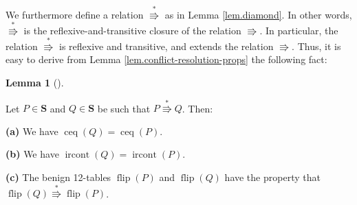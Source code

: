 \documentclass[numbers=enddot,12pt,final,onecolumn,notitlepage]{scrartcl}%
\theoremstyle{definition}
\newtheorem{lem}[theo]{Lemma}
\newenvironment{lemma}[1][]
{\begin{lem}[#1]\begin{leftbar}}
{\end{leftbar}\end{lem}}
\begin{document}
We furthermore define a relation $\overset{\ast}{\Rrightarrow}$ as in Lemma
\ref{lem.diamond}. In other words, $\overset{\ast}{\Rrightarrow}$ is the
reflexive-and-transitive closure of the relation $\Rrightarrow$. In
particular, the relation $\overset{\ast}{\Rrightarrow}$ is reflexive and
transitive, and extends the relation $\Rrightarrow$. Thus, it is easy to
derive from Lemma \ref{lem.conflict-resolution-props} the following fact:

\begin{lemma}
\label{lem.conflict-resolution-*props}Let $P\in\mathbf{S}$ and $Q\in
\mathbf{S}$ be such that $P\overset{\ast}{\Rrightarrow}Q$. Then:

\textbf{(a)} We have $\operatorname*{ceq}\left(  Q\right)
=\operatorname*{ceq}\left(  P\right)  $.

\textbf{(b)} We have $\operatorname*{ircont}\left(  Q\right)
=\operatorname*{ircont}\left(  P\right)  $.

\textbf{(c)} The benign 12-tables $\operatorname*{flip}\left(  P\right)  $ and
$\operatorname*{flip}\left(  Q\right)  $ have the property that
$\operatorname*{flip}\left(  Q\right)  \overset{\ast}{\Rrightarrow
}\operatorname*{flip}\left(  P\right)  $.
\end{lemma}
\end{document}
